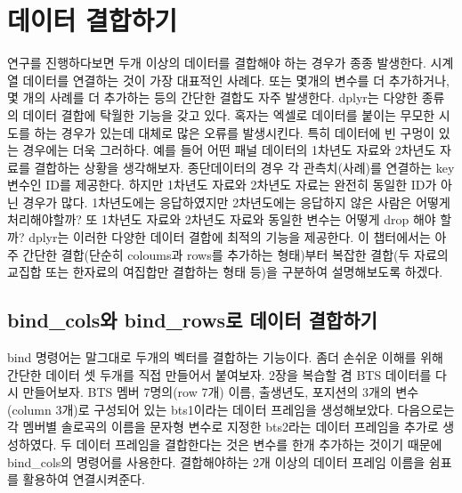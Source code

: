 \documentclass[
]{book}
\begin{document}
\section{데이터 결합하기}\label{uxb370uxc774uxd130-uxacb0uxd569uxd558uxae30}

연구를 진행하다보면 두개 이상의 데이터를 결합해야 하는 경우가 종종 발생한다. 시계열 데이터를 연결하는 것이 가장 대표적인 사례다. 또는 몇개의 변수를 더 추가하거나, 몇 개의 사례를 더 추가하는 등의 간단한 결합도 자주 발생한다. dplyr는 다양한 종류의 데이터 결합에 탁월한 기능을 갖고 있다. 혹자는 엑셀로 데이터를 붙이는 무모한 시도를 하는 경우가 있는데 대체로 많은 오류를 발생시킨다. 특히 데이터에 빈 구멍이 있는 경우에는 더욱 그러하다. 예를 들어 어떤 패널 데이터의 1차년도 자료와 2차년도 자료를 결합하는 상황을 생각해보자. 종단데이터의 경우 각 관측치(사례)를 연결하는 key 변수인 ID를 제공한다. 하지만 1차년도 자료와 2차년도 자료는 완전히 동일한 ID가 아닌 경우가 많다. 1차년도에는 응답하였지만 2차년도에는 응답하지 않은 사람은 어떻게 처리해야할까? 또 1차년도 자료와 2차년도 자료와 동일한 변수는 어떻게 drop 해야 할까? dplyr는 이러한 다양한 데이터 결합에 최적의 기능을 제공한다. 이 챕터에서는 아주 간단한 결합(단순히 coloums과 rows를 추가하는 형태)부터 복잡한 결합(두 자료의 교집합 또는 한자료의 여집합만 결합하는 형태 등)을 구분하여 설명해보도록 하겠다.

\subsection{bind\_cols와 bind\_rows로 데이터 결합하기}\label{bind_colsuxc640-bind_rowsuxb85c-uxb370uxc774uxd130-uxacb0uxd569uxd558uxae30}

bind 명령어는 말그대로 두개의 벡터를 결합하는 기능이다. 좀더 손쉬운 이해를 위해 간단한 데이터 셋 두개를 직접 만들어서 붙여보자. 2장을 복습할 겸 BTS 데이터를 다시 만들어보자. BTS 멤버 7명의(row 7개) 이름, 출생년도, 포지션의 3개의 변수(column 3개)로 구성되어 있는 bts1이라는 데이터 프레임을 생성해보았다. 다음으로는 각 멤버별 솔로곡의 이름을 문자형 변수로 지정한 bts2라는 데이터 프레임을 추가로 생성하였다. 두 데이터 프레임을 결합한다는 것은 변수를 한개 추가하는 것이기 때문에 bind\_cols의 명령어를 사용한다. 결합해야하는 2개 이상의 데이터 프레임 이름을 쉼표를 활용하여 연결시켜준다.
\end{document}
